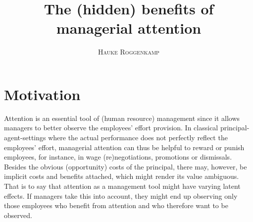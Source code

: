 \else
  \renewenvironment{abstract}{      \if@twocolumn
      \else
        \small
        \begin{center}        \end{center}      \fi}
      {\if@twocolumn\else\endquotation\fi}
\fi
\renewcommand\thetable{\@Roman\c@table}
\renewcommand\tablename{TABLE}
\renewcommand\thefigure{\@Roman\c@figure}
\renewcommand\figurename{\textsc{Figure}}
\makeatother
{}



\title{The (hidden) benefits of managerial attention}
\author{%
\textsc{Hauke Roggenkamp}}
\maketitle



\thispagestyle{empty}\setcounter{page}{0}%













\newpage
\tableofcontents
\thispagestyle{empty}\setcounter{page}{0}%

\newpage
\section{Motivation}
Attention is an essential tool of (human resource) management since it allows managers to better observe the employees' effort provision. In classical principal-agent-settings where the actual performance does not perfectly reflect the employees' effort, managerial attention can thus be helpful to reward or punish employees, for instance, in wage (re)negotiations, promotions or dismissals. Besides the obvious (opportunity) costs of the principal, there may, however, be implicit costs and benefits attached, which might render its value ambiguous. That is to say that  attention as a management tool might have varying latent effects. If managers take this into account, they might end up observing only those employees who benefit from attention and who therefore want to be observed. 

